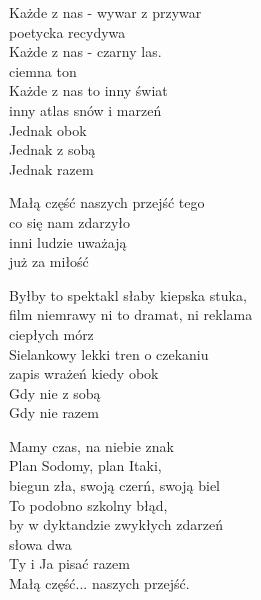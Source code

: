 \begin{text}
    Każde z nas - wywar z przywar\\
    poetycka recydywa\\
    Każde z nas - czarny las.\\
    ciemna ton\\
    Każde z nas to inny świat\\
    inny atlas snów i marzeń\\
    Jednak obok\\
    Jednak z sobą\\
    Jednak razem

    Małą część naszych przejść tego\\
    co się nam zdarzyło\\
    inni ludzie uważają\\
    już za miłość

    Byłby to spektakl słaby kiepska stuka,\\
    film niemrawy ni to dramat, ni reklama\\
    ciepłych mórz\\
    Sielankowy lekki tren o czekaniu\\
    zapis wrażeń kiedy obok\\
    Gdy nie z sobą\\
    Gdy nie razem

    Mamy czas, na niebie znak\\
    Plan Sodomy, plan Itaki,\\
    biegun zła, swoją czerń, swoją biel\\
    To podobno szkolny błąd,\\
    by w dyktandzie zwykłych zdarzeń\\
    słowa dwa\\
    Ty i Ja pisać razem\\
    Małą część... naszych przejść.
\end{text}
\begin{chord}

\end{chord}
